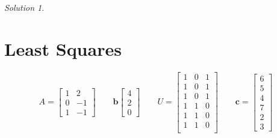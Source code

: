 \documentclass{article}
\theoremstyle{remark}
\newtheorem*{solution}{Solution}
\newcommand{\vv}[1]{\mathbf{#1}}
\begin{document}
\medskip

\begin{solution}
\end{solution}

\pagebreak
\section{Least Squares}

\begin{displaymath}
  A =
  \begin{bmatrix}
    1 & 2 \\
    0 & -1 \\
    1 & -1
  \end{bmatrix}
  \qquad
  \vv b
  \begin{bmatrix}
    4 \\ 2 \\ 0
  \end{bmatrix}
  \qquad
  U =
  \begin{bmatrix}
    1 & 0 & 1 \\
    1 & 0 & 1 \\
    1 & 0 & 1 \\
    1 & 1 & 0 \\
    1 & 1 & 0 \\
    1 & 1 & 0 \\
  \end{bmatrix}
  \qquad
  \vv c =
  \begin{bmatrix}
    6 \\ 5 \\ 4 \\ 7 \\ 2 \\ 3
  \end{bmatrix}
\end{displaymath}
\end{document}
